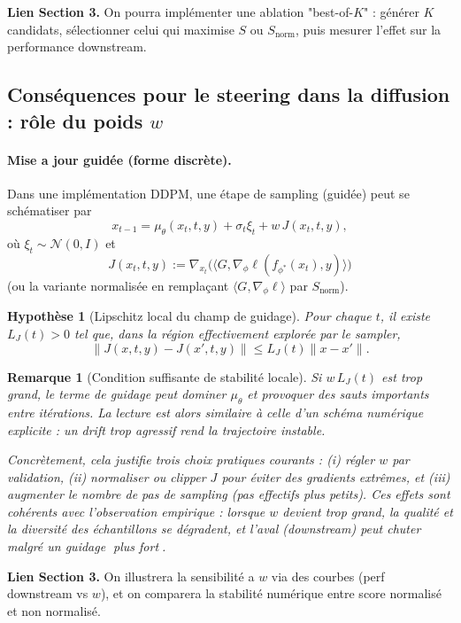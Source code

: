 \documentclass[11pt]{article}
\newtheorem{assumption}{Hypothèse}
\newtheorem{remark}{Remarque}
\begin{document}
\noindent\textbf{Lien Section 3.}
On pourra implémenter une ablation "best-of-$K$" : générer $K$ candidats, sélectionner celui qui maximise $S$ ou $S_{\text{norm}}$, puis mesurer l'effet sur la performance downstream.

\subsection{Conséquences pour le steering dans la diffusion : rôle du poids $w$}

\paragraph{Mise a jour guidée (forme discrète).}
Dans une implémentation DDPM, une étape de sampling (guidée) peut se schématiser par
\[
x_{t-1} = \mu_\theta(x_t,t,y) + \sigma_t\xi_t + w\,J(x_t,t,y),
\]
où $\xi_t\sim\mathcal N(0,I)$ et
\[
J(x_t,t,y) := \nabla_{x_t}\Big(\langle G, \nabla_\phi \ell(f_{\phi^*}(x_t),y)\rangle\Big)
\]
(ou la variante normalisée en remplaçant $\langle G,\nabla_\phi\ell\rangle$ par $S_{\text{norm}}$).

\begin{assumption}[Lipschitz local du champ de guidage]
\label{ass:LJ}
Pour chaque $t$, il existe $L_J(t)>0$ tel que, dans la région effectivement explorée par le sampler,
\[
\|J(x,t,y)-J(x',t,y)\| \le L_J(t)\|x-x'\|.
\]
\end{assumption}

\begin{remark}[Condition suffisante de stabilité locale]
Si $w\,L_J(t)$ est trop grand, le terme de guidage peut dominer $\mu_\theta$ et provoquer des sauts importants entre itérations. La lecture est alors similaire à celle d'un schéma numérique explicite : un drift trop agressif rend la trajectoire instable.

Concrètement, cela justifie trois choix pratiques courants : (i) régler $w$ par validation, (ii) normaliser ou \emph{clipper} $J$ pour éviter des gradients extrêmes, et (iii) augmenter le nombre de pas de sampling (pas effectifs plus petits). Ces effets sont cohérents avec l'observation empirique : lorsque $w$ devient trop grand, la qualité et la diversité des échantillons se dégradent, et l'aval (downstream) peut chuter malgré un guidage plus fort.
\end{remark}

\noindent\textbf{Lien Section 3.}
On illustrera la sensibilité a $w$ via des courbes (perf downstream vs $w$), et on comparera la stabilité numérique entre score normalisé et non normalisé.
\end{document}
